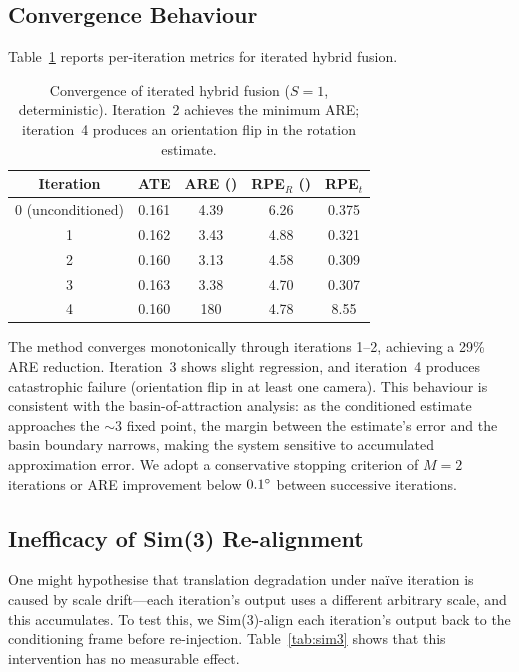 \subsection{Convergence Behaviour}

Table~\ref{tab:convergence} reports per-iteration metrics for iterated hybrid fusion.

\begin{table}[h]
\centering
\caption{Convergence of iterated hybrid fusion ($S=1$, deterministic). Iteration~2 achieves the minimum ARE; iteration~4 produces an orientation flip in the rotation estimate.}
\label{tab:convergence}
\begin{tabular}{@{}ccccc@{}}
\toprule
Iteration & ATE & ARE (\degree{}) & RPE$_R$ (\degree{}) & RPE$_t$ \\
\midrule
0 (unconditioned) & 0.161 & 4.39 & 6.26 & 0.375 \\
1 & 0.162 & 3.43 & 4.88 & 0.321 \\
2 & 0.160 & 3.13 & 4.58 & 0.309 \\
3 & 0.163 & 3.38 & 4.70 & 0.307 \\
4 & 0.160 & 180\degree{} & 4.78 & 8.55 \\
\bottomrule
\end{tabular}
\end{table}

The method converges monotonically through iterations 1--2, achieving a 29\% ARE reduction. Iteration~3 shows slight regression, and iteration~4 produces catastrophic failure (orientation flip in at least one camera). This behaviour is consistent with the basin-of-attraction analysis: as the conditioned estimate approaches the $\sim$3\degree{} fixed point, the margin between the estimate's error and the basin boundary narrows, making the system sensitive to accumulated approximation error. We adopt a conservative stopping criterion of $M=2$ iterations or ARE improvement below $0.1\degree{}$ between successive iterations.

\subsection{Inefficacy of Sim(3) Re-alignment}

One might hypothesise that translation degradation under na\"ive iteration is caused by scale drift---each iteration's output uses a different arbitrary scale, and this accumulates. To test this, we Sim(3)-align each iteration's output back to the conditioning frame before re-injection. Table~\ref{tab:sim3} shows that this intervention has no measurable effect.

